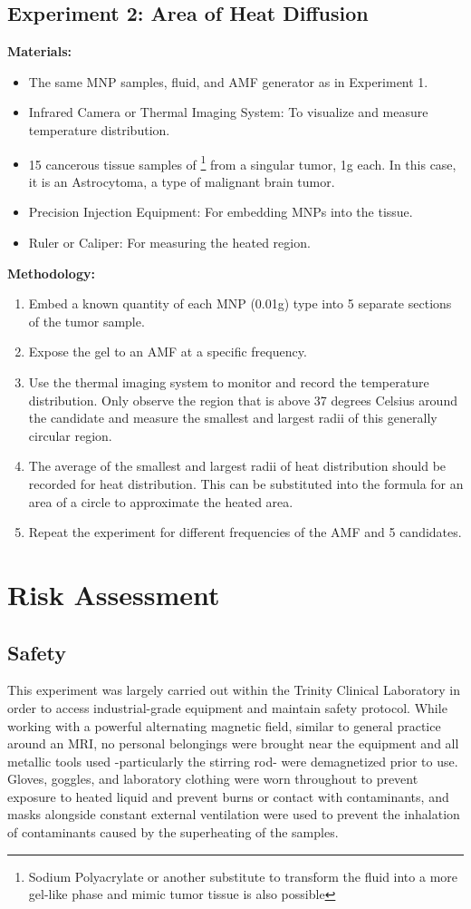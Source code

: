 \documentclass[12pt]{article}
\numberwithin{equation}{section}
\numberwithin{equation}{section}
\begin{document}
\subsection{Experiment 2: Area of Heat Diffusion}
\textbf{Materials:}
\begin{itemize}
    \item The same MNP samples, fluid, and AMF generator as in Experiment 1.
    \item Infrared Camera or Thermal Imaging System: To visualize and measure temperature distribution.
    \item 15 cancerous tissue samples of \footnote{Sodium Polyacrylate or another substitute to transform the fluid into a more gel-like phase and mimic tumor tissue is also possible} from a singular tumor, 1g each. In this case, it is an Astrocytoma, a type of malignant brain tumor.
    \item Precision Injection Equipment: For embedding MNPs into the tissue.
    \item Ruler or Caliper: For measuring the heated region.
\end{itemize}
\textbf{Methodology:}
\begin{enumerate}
    \item Embed a known quantity of each MNP (0.01g) type into 5 separate sections of the tumor sample.
    \item Expose the gel to an AMF at a specific frequency.
    \item Use the thermal imaging system to monitor and record the temperature distribution. Only observe the region that is above 37 degrees Celsius around the candidate and measure the smallest and largest radii of this generally circular region.
    \item The average of the smallest and largest radii of heat distribution should be recorded for heat distribution. This can be substituted into the formula for an area of a circle to approximate the heated area.
    \item Repeat the experiment for different frequencies of the AMF and 5 candidates.
\end{enumerate}
\section{Risk Assessment}
\subsection{Safety}
{This experiment was largely carried out within the Trinity Clinical Laboratory in order to access industrial-grade equipment and maintain safety protocol. While working with a powerful alternating magnetic field, similar to general practice around an MRI, no personal belongings were brought near the equipment and all metallic tools used -particularly the stirring rod- were demagnetized prior to use. Gloves, goggles, and laboratory clothing were worn throughout to prevent exposure to heated liquid and prevent burns or contact with contaminants, and masks alongside constant external ventilation were used to prevent the inhalation of contaminants caused by the superheating of the samples. }
\end{document}
